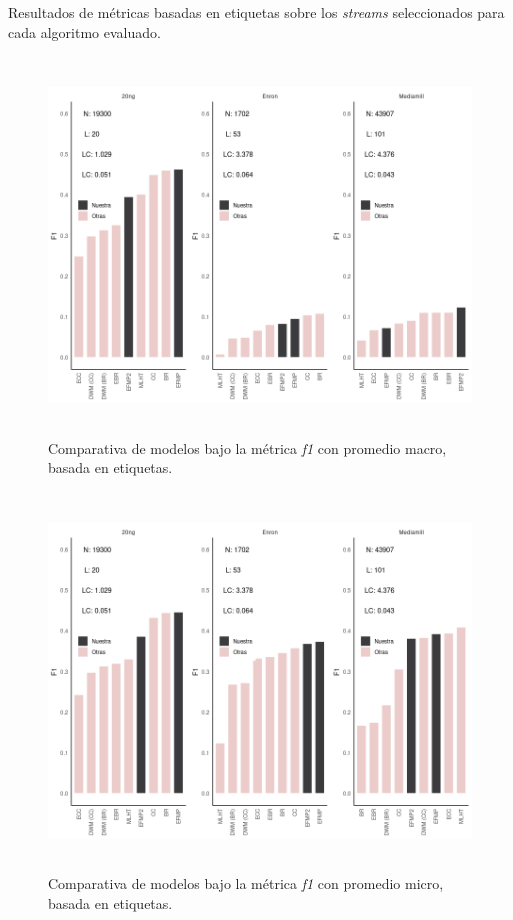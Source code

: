 \begin{table}[htbp]
	\centering
	\begin{adjustbox}{max width=\textwidth}
		
	\end{adjustbox}
	\begin{adjustbox}{max width=\textwidth}
		
	\end{adjustbox}
	\caption{Resultados de métricas basadas en etiquetas sobre los
		\textit{streams} seleccionados para cada algoritmo evaluado.}
	\label{tab:label_based}
\end{table}

\begin{figure}
	\includegraphics[width=\linewidth,height=10cm]{figures/experiments/classification/f1_macro.png}
	\caption{Comparativa de modelos bajo la métrica \textit{f1} con promedio
		macro, basada en etiquetas.}
	\label{fig:comparativa_f1_macro}
\end{figure}

\begin{figure}
	\includegraphics[width=\linewidth,height=10cm]{figures/experiments/classification/f1_micro.png}
	\caption{Comparativa de modelos bajo la métrica \textit{f1} con promedio
		micro, basada en etiquetas.}
	\label{fig:comparativa_f1_micro}
\end{figure}

